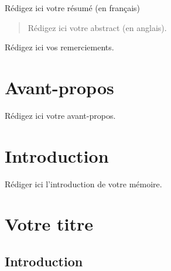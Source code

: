 \documentclass[12pt]{ulaval}
\date{Décembre 2024}
\begin{document}
  \maketitle

\frontmatter %
\pagestyle{plain} %
\setcounter{page}{2}

  \begin{resume}
    Rédigez ici votre résumé (en français)
  \end{resume}

  \begin{abstract}
    Rédigez ici votre abstract (en anglais).
  \end{abstract}

% 
  \hypersetup{linkcolor=black}
   \setcounter{tocdepth}{2}
  \tableofcontents

  \listoftables

  \listoffigures

  \begin{remerciements}
    Rédigez ici vos remerciements.

    \chapter{Avant-propos}\label{avant-propos}

    Rédigez ici votre avant-propos.
  \end{remerciements}

% 
\mainmatter %
\pagestyle{fancyplain} %

\doublespace

\chapter*{Introduction}\label{introduction}

Rédiger ici l'introduction de votre mémoire.

\chapter{Votre titre}\label{votre-titre}

\section{Introduction}\label{introduction-1}
\end{document}
